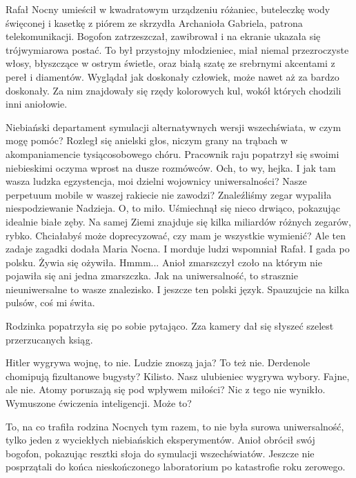 Rafał Nocny umieścił w kwadratowym urządzeniu różaniec, buteleczkę wody święconej i kasetkę z piórem ze skrzydła Archanioła Gabriela, patrona telekomunikacji.
Bogofon zatrzeszczał, zawibrował i na ekranie ukazała się trójwymiarowa postać.
To był przystojny młodzieniec, miał niemal przezroczyste włosy, błyszczące w ostrym świetle, oraz białą szatę ze srebrnymi akcentami z pereł i diamentów.
Wyglądał jak doskonały człowiek, może nawet aż za bardzo doskonały.
Za nim znajdowały się rzędy kolorowych kul, wokół których chodzili inni aniołowie.
\begin{dialogue}
	\ds{} Niebiański departament symulacji alternatywnych wersji wszechświata, w czym mogę pomóc? 
		\dm{} Rozległ się anielski głos, niczym grany na trąbach w akompaniamencie tysiącosobowego chóru. Pracownik raju popatrzył się swoimi niebieskimi oczyma wprost na dusze rozmówców.
		\dm{} Och, to wy, hejka. I jak tam wasza ludzka egzystencja, moi dzielni wojownicy uniwersalności? Nasze perpetuum mobile w waszej rakiecie nie zawodzi?
	\ds{} Znaleźliśmy zegar 
		\dm{} wypaliła niespodziewanie Nadzieja.
	\ds{} O, to miło. 
		\dm{} Uśmiechnął się nieco drwiąco, pokazując idealnie białe zęby. 
		\dm{} Na samej Ziemi znajduje się kilka miliardów różnych zegarów, rybko. Chciałabyś może doprecyzować, czy mam je wszystkie wymienić?
	\ds{} Ale ten zadaje zagadki 
		\dm{} dodała Maria Nocna.
	\ds{} I morduje ludzi 
		\dm{} wspomniał Rafał.
	\ds{} I gada po polsku. 
		\dm{} Żywia się ożywiła.
	\ds{} Hmmm... 
		\dm{} Anioł zmarszczył czoło na którym nie pojawiła się ani jedna zmarszczka.
		\dm{} Jak na uniwersalność, to strasznie nieuniwersalne to wasze znalezisko. I jeszcze ten polski język. Spauzujcie na kilka pulsów, coś mi świta.
\end{dialogue}
Rodzinka popatrzyła się po sobie pytająco. Zza kamery dał się słyszeć szelest przerzucanych ksiąg.
\begin{dialogue}
	\ds{} Hitler wygrywa wojnę, to nie.
	\ds{} Ludzie znoszą jaja? To też nie.
	\ds{} Derdenole chomipują fizultanowe bugysty? Kilisto.
	\ds{} Nasz ulubieniec wygrywa wybory. Fajne, ale nie.
	\ds{} Atomy poruszają się pod wpływem miłości? Nic z tego nie wynikło.
	\ds{} Wymuszone ćwiczenia inteligencji. Może to?
\end{dialogue}
To, na co trafiła rodzina Nocnych tym razem, to nie była surowa uniwersalność, tylko jeden z wyciekłych niebiańskich eksperymentów.
Anioł obrócił swój bogofon, pokazując resztki słoja do symulacji wszechświatów.
Jeszcze nie posprzątali do końca nieskończonego laboratorium po katastrofie roku zerowego.
